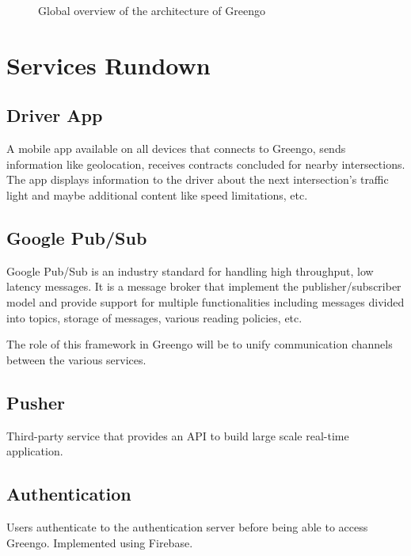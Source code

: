 \documentclass[letterpaper,10pt,english]{sphinxmanual}
\begin{document}
\begin{figure}[htbp]
\centering
\capstart

\noindent{}
\caption{Global overview of the architecture of Greengo}\label{\detokenize{system_architecture:id1}}\end{figure}


\section{Services Rundown}
\label{\detokenize{system_architecture:services-rundown}}

\subsection{Driver App}
\label{\detokenize{system_architecture:driver-app}}
A mobile app available on all devices that connects to Greengo, sends information like geolocation, receives contracts concluded for nearby intersections.
The app displays information to the driver about the next intersection’s traffic light and maybe additional content like speed limitations, etc.


\subsection{Google Pub/Sub}
\label{\detokenize{system_architecture:google-pub-sub}}
Google Pub/Sub is an industry standard for handling high throughput, low latency messages.
It is a message broker that implement the publisher/subscriber model and provide support for multiple functionalities including messages divided into topics, storage of messages, various reading policies, etc.

The role of this framework in Greengo will be to unify communication channels between the various services.


\subsection{Pusher}
\label{\detokenize{system_architecture:pusher}}
Third-party service that provides an API to build large scale real-time application.


\subsection{Authentication}
\label{\detokenize{system_architecture:authentication}}
Users authenticate to the authentication server before being able to access Greengo.
Implemented using Firebase.
\end{document}
